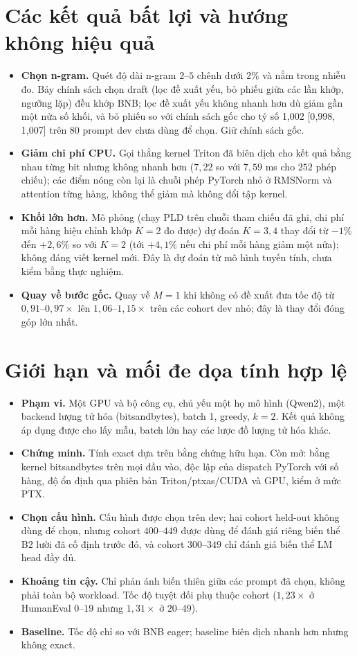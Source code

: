 \documentclass[a4paper,11pt]{article}
\newcommand{\ci}[3]{#1 [#2,\,#3]}
\begin{document}
\section{Các kết quả bất lợi và hướng không hiệu quả}\label{sec:negative}
\begin{itemize}[nosep]
\item \textbf{Chọn n-gram.} Quét độ dài n-gram $2$--$5$ chênh dưới $2\%$ và nằm trong nhiễu đo. Bảy chính sách chọn draft (lọc đề xuất yếu, bỏ phiếu giữa các lần khớp, ngưỡng lặp) đều khớp BNB; lọc đề xuất yếu không nhanh hơn dù giảm gần một nửa số khối, và bỏ phiếu so với chính sách gốc cho tỷ số \ci{1{,}002}{0{,}998}{1{,}007} trên $80$ prompt dev chưa dùng để chọn. Giữ chính sách gốc.
\item \textbf{Giảm chi phí CPU.} Gọi thẳng kernel Triton đã biên dịch cho kết quả bằng nhau từng bit nhưng không nhanh hơn ($7{,}22$ so với $7{,}59$ ms cho $252$ phép chiếu); các điểm nóng còn lại là chuỗi phép PyTorch nhỏ ở RMSNorm và attention từng hàng, không thể giảm mà không đổi tập kernel.
\item \textbf{Khối lớn hơn.} Mô phỏng (chạy PLD trên chuỗi tham chiếu đã ghi, chi phí mỗi hàng hiệu chỉnh khớp $K{=}2$ đo được) dự đoán $K{=}3,4$ thay đổi từ $-1\%$ đến $+2{,}6\%$ so với $K{=}2$ (tới $+4{,}1\%$ nếu chi phí mỗi hàng giảm một nửa); không đáng viết kernel mới. Đây là dự đoán từ mô hình tuyến tính, chưa kiểm bằng thực nghiệm.
\item \textbf{Quay về bước gốc.} Quay về $M{=}1$ khi không có đề xuất đưa tốc độ từ $0{,}91$--$0{,}97\times$ lên $1{,}06$--$1{,}15\times$ trên các cohort dev nhỏ; đây là thay đổi đóng góp lớn nhất.
\end{itemize}

\section{Giới hạn và mối đe dọa tính hợp lệ}
\begin{itemize}[nosep]
\item \textbf{Phạm vi.} Một GPU và bộ công cụ, chủ yếu một họ mô hình (Qwen2), một backend lượng tử hóa (bitsandbytes), batch 1, greedy, $k{=}2$. Kết quả không áp dụng được cho lấy mẫu, batch lớn hay các lược đồ lượng tử hóa khác.
\item \textbf{Chứng minh.} Tính exact dựa trên bằng chứng hữu hạn. Còn mở: bằng kernel bitsandbytes trên mọi đầu vào, độc lập của dispatch PyTorch với số hàng, độ ổn định qua phiên bản Triton/ptxas/CUDA và GPU, kiểm ở mức PTX.
\item \textbf{Chọn cấu hình.} Cấu hình được chọn trên dev; hai cohort held-out không dùng để chọn, nhưng cohort $400$--$449$ được dùng để đánh giá riêng biến thể B2 lười đã cố định trước đó, và cohort $300$--$349$ chỉ đánh giá biến thể LM head đầy đủ.
\item \textbf{Khoảng tin cậy.} Chỉ phản ánh biến thiên giữa các prompt đã chọn, không phải toàn bộ workload. Tốc độ tuyệt đối phụ thuộc cohort ($1{,}23\times$ ở HumanEval $0$--$19$ nhưng $1{,}31\times$ ở $20$--$49$).
\item \textbf{Baseline.} Tốc độ chỉ so với BNB eager; baseline biên dịch nhanh hơn nhưng không exact.
\end{itemize}
\end{document}
